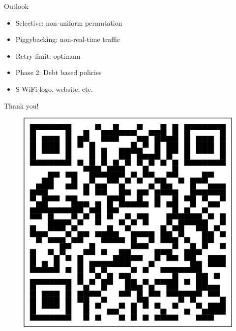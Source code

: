 \documentclass{beamer}
\begin{document}
\begin{frame}{Outlook}
  \begin{itemize}
    \item Selective: non-uniform permutation
    \item Piggybacking: non-real-time traffic
    \item Retry limit: optimum
    \item Phase 2: Debt based policies
    \item S-WiFi logo, website, etc.
  \end{itemize}
\end{frame}

\begin{frame}
  \begin{center}
    {\Huge\calligra Thank you!}
  \end{center}
  \begin{figure}[htbp]
    \centering
    \includegraphics[height=.3\textheight]{url.pdf}
  \end{figure}
\end{frame}
\end{document}
